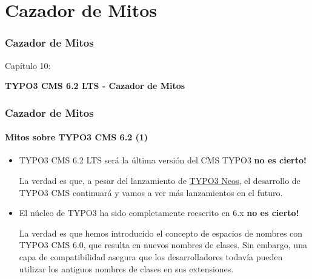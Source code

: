 %

\section{Cazador de Mitos}
\begin{frame}[fragile]
	\frametitle{Cazador de Mitos}

	\begin{center}\huge{Capítulo 10:}\end{center}
	\begin{center}\huge{\color{typo3darkgrey}\textbf{TYPO3 CMS 6.2 LTS - Cazador de Mitos}}\end{center}

\end{frame}


\begin{frame}[fragile]
	\frametitle{Cazador de Mitos}
	\framesubtitle{Mitos sobre TYPO3 CMS 6.2 (1)}

	\begin{itemize}
		\item TYPO3 CMS 6.2 LTS será la última versión del CMS TYPO3\newline
			\tabto{8.4cm}\color{red}\textbf{\textrightarrow no es cierto!}\color{black}

			\smaller
				La verdad es que, a pesar del lanzamiento de \href{http://neos.typo3.org}{TYPO3 Neos}, el desarrollo de TYPO3 CMS continuará y vamos a ver más lanzamientos en el futuro.
			\normalsize

		\item El núcleo de TYPO3 ha sido completamente reescrito en 6.x\newline
			\tabto{8.4cm}\color{red}\textbf{\textrightarrow no es cierto!}\color{black}

			\smaller
				La verdad es que hemos introducido el concepto de espacios de nombres con TYPO3 CMS 6.0, que resulta en nuevos nombres de clases. Sin embargo, una capa de compatibilidad asegura que los desarrolladores todavía pueden utilizar los antiguos nombres de clases en sus extensiones.
	\end{itemize}

\end{frame}


